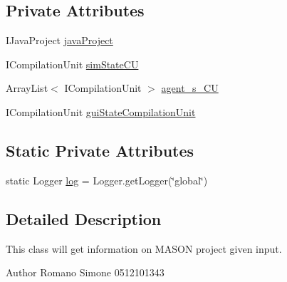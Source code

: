 \subsection*{Private Attributes}
\begin{DoxyCompactItemize}
\item 
I\-Java\-Project \hyperlink{classit_1_1isislab_1_1masonassisteddocumentation_1_1mason_1_1analizer_1_1_project_analizer_a9ab2f8abee324102d02f76a9b26761ac}{java\-Project}
\item 
I\-Compilation\-Unit \hyperlink{classit_1_1isislab_1_1masonassisteddocumentation_1_1mason_1_1analizer_1_1_project_analizer_a07aa57793cd440c2e8ae37bc70aabdb2}{sim\-State\-C\-U}
\item 
Array\-List$<$ I\-Compilation\-Unit $>$ \hyperlink{classit_1_1isislab_1_1masonassisteddocumentation_1_1mason_1_1analizer_1_1_project_analizer_ac580240681056ef8e031f6422c3d5260}{agent\-\_\-s\-\_\-\-C\-U}
\item 
I\-Compilation\-Unit \hyperlink{classit_1_1isislab_1_1masonassisteddocumentation_1_1mason_1_1analizer_1_1_project_analizer_af67d3ec6b5d1743723d404d2a0fbe19b}{gui\-State\-Compilation\-Unit}
\end{DoxyCompactItemize}
\subsection*{Static Private Attributes}
\begin{DoxyCompactItemize}
\item 
static Logger \hyperlink{classit_1_1isislab_1_1masonassisteddocumentation_1_1mason_1_1analizer_1_1_project_analizer_a16444913c6ffdc96dc593a0a62b32bb3}{log} = Logger.\-get\-Logger(\char`\"{}global\char`\"{})
\end{DoxyCompactItemize}


\subsection{Detailed Description}
This class will get information on M\-A\-S\-O\-N project given input. \begin{DoxyAuthor}{Author}
Romano Simone 0512101343 
\end{DoxyAuthor}


